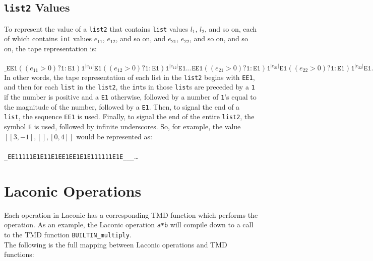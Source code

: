 \documentclass[11pt]{article}
\begin{document}
\subsection{\texttt{list2} Values}

To represent the value of a \texttt{list2} that contains \texttt{list} values $l_1$, $l_2$, and so on, each of which contains \texttt{int} values $e_{11}$, $e_{12}$, and so on, and $e_{21}$, $e_{22}$, and so on, and so on, the tape representation is: \\ \\
$\texttt{_EE1}((e_{11}>0)?\texttt{1}:\texttt{E1})\texttt{1}^{|e_{11}|}\texttt{E1}
((e_{12}>0)?\texttt{1}:\texttt{E1})\texttt{1}^{|e_{12}|}\texttt{E1}\dots\texttt{EE1}
((e_{21}>0)?\texttt{1}:\texttt{E1})\texttt{1}^{|e_{21}|}\texttt{E1}
((e_{22}>0)?\texttt{1}:\texttt{E1})\texttt{1}^{|e_{22}|}\texttt{E1}\dots\dots\texttt{E_}^\infty$ \\

In other words, the tape representation of each list in the \texttt{list2} begins with \texttt{EE1}, and then for each \texttt{list} in the \texttt{list2}, the \texttt{int}s in those \texttt{list}s are preceded by a \texttt{1} if the number is positive and a \texttt{E1} otherwise, followed by a number of \texttt{1}'s equal to the magnitude of the number, followed by a \texttt{E1}. Then, to signal the end of a \texttt{list}, the sequence \texttt{EE1} is used. Finally, to signal the end of the entire \texttt{list2}, the symbol \texttt{E} is used, followed by infinite underscores. So, for example, the value $[[3,-1], [], [0,4]]$ would be represented as: \\ \\
\texttt{_EE11111E1E11E1EE1EE1E1E111111E1E___}\dots

\section{Laconic Operations}

Each operation in Laconic has a corresponding TMD function which performs the operation. As an example, the Laconic operation \texttt{a*b} will compile down to a call to the TMD function \texttt{BUILTIN_multiply}. \\

The following is the full mapping between Laconic operations and TMD functions: \\ \\
\end{document}
